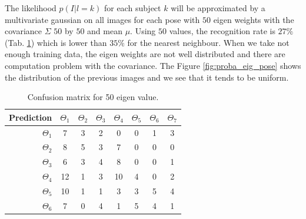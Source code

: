 \documentclass[runningheads,a4paper]{llncs}
\begin{document}
The likelihood $p(I|l=k)$ for each subject $k$ will be approximated by a multivariate gaussian on all images for each pose with $50$ eigen weights with the covariance $\Sigma$ $50$ by $50$ and mean $\mu$. Using $50$ values, the recognition rate is $27\%$ (Tab. \ref{tab:conf50pose}) which is lower than $35\%$ for the nearest neighbour. When we take not enough training data, the eigen weights are not well distributed and there are computation problem with the covariance. The Figure \ref{fig:proba_eig_pose} shows the distribution of the previous images and we see that it tends to be uniform.
\begin{table}
\centering
\caption{Confusion matrix for 50 eigen value.}
\label{tab:conf50pose}
\begin{tabular}{@{}r|ccccccc@{}}
\toprule
Prediction & \multicolumn{1}{r}{$\Theta_1$} & \multicolumn{1}{r}{$\Theta_2$} & \multicolumn{1}{r}{$\Theta_3$} & \multicolumn{1}{r}{$\Theta_4$} & \multicolumn{1}{r}{$\Theta_5$} & \multicolumn{1}{r}{$\Theta_6$} & \multicolumn{1}{r}{$\Theta_7$} \\ \midrule
$\Theta_1$ & 7                              & 3                              & 2                              & 0                              & 0                              & 1                              & 3                              \\
$\Theta_2$ & 8                              & 5                              & 3                              & 7                              & 0                              & 0                              & 0                              \\
$\Theta_3$ & 6                              & 3                              & 4                              & 8                              & 0                              & 0                              & 1                              \\
$\Theta_4$ & 12                             & 1                              & 3                              & 10                             & 4                              & 0                              & 2                              \\
$\Theta_5$ & 10                             & 1                              & 1                              & 3                              & 3                              & 5                              & 4                              \\
$\Theta_6$ & 7                              & 0                              & 4                              & 1                              & 5                              & 4                              & 1                              \\

\end{tabular}
\end{table}
\end{document}
